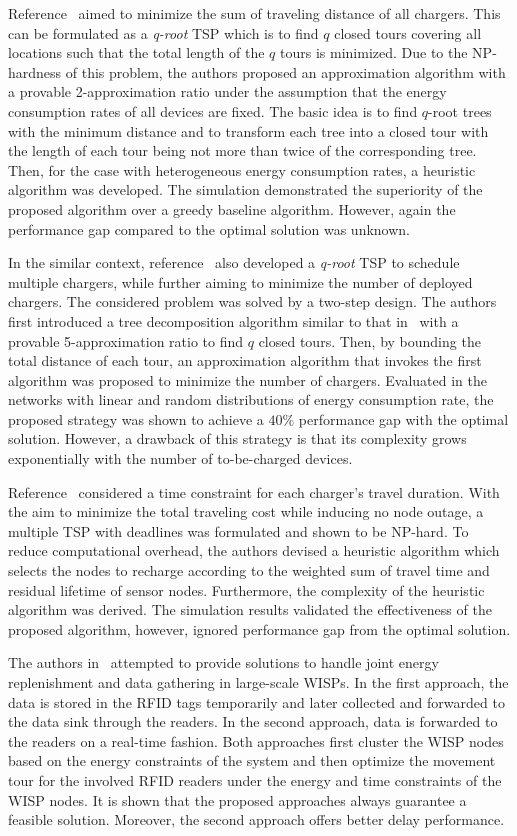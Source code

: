 \documentclass[twocolumn,10pt]{IEEEtran}
\begin{document}
Reference~\cite{W.2014Xu} aimed to minimize the sum of traveling distance of all chargers. This can be formulated as a \emph{q-root} TSP which is to find $q$ closed tours covering all locations such that the total length of the $q$ tours is minimized. Due to the NP-hardness of this problem, the authors proposed an approximation algorithm with a provable 2-approximation ratio under the assumption that the energy consumption rates of all devices are fixed. The basic idea is to find $q$-root trees with the minimum distance and to transform each tree into a closed tour with the length of each tour being not more than twice of the corresponding tree. Then, for the case with heterogeneous energy consumption rates, a heuristic algorithm was developed. The simulation demonstrated the superiority of the proposed algorithm over a greedy baseline algorithm. However, again the performance gap compared to the optimal solution was unknown. 

In the similar context, reference~\cite{W.2014Liang} also developed a \emph{q-root} TSP to schedule multiple chargers, while further aiming to minimize the number of deployed chargers. The considered problem was solved by a two-step design. The authors first introduced a tree decomposition algorithm similar to that in~\cite{W.2014Xu} with a provable 5-approximation ratio to find $q$ closed tours. Then, by bounding the total distance of each tour, an approximation algorithm that invokes the first algorithm was proposed to minimize the number of chargers. Evaluated in the networks with linear and random distributions of energy consumption rate, the proposed strategy was shown to achieve a $40\%$ performance gap with the optimal solution. However, a drawback of this strategy is that its complexity grows exponentially with the number of to-be-charged devices.


Reference~\cite{C2013WangCoordination} considered a time constraint for each charger's travel duration.  With the aim to minimize the total traveling cost while inducing no node outage, a multiple TSP with deadlines was formulated and shown to be NP-hard. To reduce computational overhead, the authors devised a heuristic algorithm which selects the nodes to recharge according to the weighted sum of travel time and residual lifetime of sensor nodes. Furthermore, the complexity of the heuristic algorithm was derived. The simulation results validated the effectiveness of the proposed algorithm, however, ignored performance gap from the optimal solution.

The authors in~\cite{2015I.Farris} attempted to provide solutions to handle joint energy replenishment and data gathering in large-scale WISPs.
In the first approach, the data is stored in the RFID tags temporarily and later collected and forwarded to the data sink through the readers. In the second approach, data is forwarded to the readers on a real-time fashion. 
Both approaches first cluster the WISP nodes based on the energy constraints of the system and then optimize the movement tour for the involved RFID readers under the energy and time constraints of the WISP nodes.
It is shown that the proposed approaches always guarantee a feasible solution. Moreover, the second approach offers better delay performance.
\end{document}

